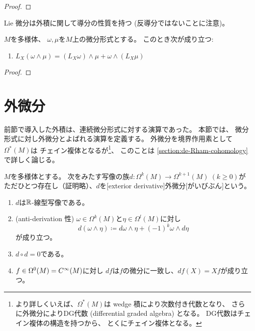 \documentclass[report]{jlreq}
\begin{document}
\begin{proof}
    \TODO{}
\end{proof}

Lie 微分は外積に関して導分の性質を持つ (反導分ではないことに注意)。

\begin{proposition}
    $M$を多様体、
    $\omega, \mu$を$M$上の微分形式とする。
    このとき次が成り立つ:
    \begin{enumerate}
        \item $L_X (\omega \wedge \mu)
            = (L_X \omega) \wedge \mu + \omega \wedge (L_X \mu)$
    \end{enumerate}
\end{proposition}

\begin{proof}
    \TODO{}
\end{proof}


%
\section{外微分}

前節で導入した外積は、連続微分形式に対する演算であった。
本節では、
{\smooth}微分形式に対し外微分とよばれる演算を定義する。
外微分を境界作用素として$\Omega^*(M)$は
チェイン複体となるが\footnote{
    より詳しくいえば、$\Omega^*(M)$は wedge 積により次数付き代数となり、
    さらに外微分によりDG代数 (differential graded algebra) となる。
    DG代数はチェイン複体の構造を持つから、
    とくにチェイン複体となる。
}、
このことは \cref{section:de-Rham-cohomology} で詳しく論じる。

\begin{definition}[外微分]
    $M$を多様体とする。
    次をみたす写像の族$d \colon \Omega^k(M) \to \Omega^{k+1}(M)\; (k \ge 0)$が
    ただひとつ存在し（証明略）、$d$を[exterior derivative]{外微分}[がいびぶん]という。
    \begin{enumerate}
        \item $d$は$\mathbb{R}$-線型写像である。
        \item (anti-derivation 性)
            $\omega \in \Omega^k(M)$と$\eta \in \Omega^l(M)$に対し
            \begin{equation}
                d(\omega \wedge \eta)
                    \coloneqq d\omega \wedge \eta + (-1)^k \omega \wedge d\eta
            \end{equation}
            が成り立つ。
        \item $d \circ d = 0$である。
        \item $f \in \Omega^0(M) = C^\infty(M)$に対し
            $df$は$f$の微分に一致し、$df(X) = Xf$が成り立つ。
    \end{enumerate}
\end{definition}
\end{document}
